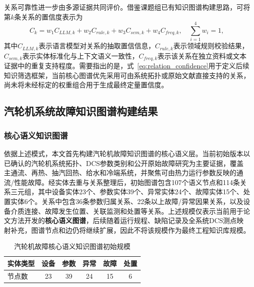 关系可靠性进一步由多源证据共同评价。借鉴课题组已有知识图谱构建思路，可将第$k$条关系的置信度表示为
\begin{equation}
C_k=w_1C_{LLM,k}+w_2C_{rule,k}+w_3C_{sem,k}+w_4C_{freq,k},
\quad \sum_{i=1}^{4}w_i=1,
\label{eq:relation_confidence}
\end{equation}
其中$C_{LLM,k}$表示语言模型对关系的抽取置信信息，$C_{rule,k}$表示领域规则校验结果，$C_{sem,k}$表示实体标准化与上下文语义一致性，$C_{freq,k}$表示该关系在独立资料或文本证据中的重复支持程度。需要指出的是，式~\eqref{eq:relation_confidence}用于定义后续知识筛选框架，当前核心图谱优先采用可由系统拓扑或原始文献直接支持的关系，尚未将未经标定的权重组合用于生成最终定量置信度。

\subsection{汽轮机系统故障知识图谱构建结果}
\label{subsec:kg_result}

\subsubsection{核心语义知识图谱}

依据上述模式，本文首先构建汽轮机故障知识图谱的核心语义层。当前初始版本以已确认的汽轮机系统拓扑、DCS参数类别和公开原始故障研究为主要证据，覆盖主通流、再热、抽汽回热、给水和冷端系统，并聚焦可由热力运行参数反映的通流/性能故障。经实体去重与关系整理后，初始图谱包含107个语义节点和114条关系三元组，其中设备实体23个、参数实体39个、异常实体24个、故障实体15个、处置实体6个。关系中包含36条参数归属关系、22条以上故障/异常因果关系，以及设备介质连接、故障发生位置、关联监测和处置等关系。上述规模仅表示当前用于论文方法开发的\textbf{核心语义图谱}，后续随着运行规程、缺陷记录及全系统DCS测点映射补充，图谱节点和边仍将继续扩展，因此不将该规模作为最终工程知识库规模。

\begin{table}[htbp]
\centering
\caption{汽轮机故障核心语义知识图谱初始规模}
\label{tab:kg_stats}
\begin{tabular}{lccccc}
\toprule
实体类型 & 设备 & 参数 & 异常 & 故障 & 处置 \\
\midrule
节点数 & 23 & 39 & 24 & 15 & 6 \\
\bottomrule
\end{tabular}
\end{table}

